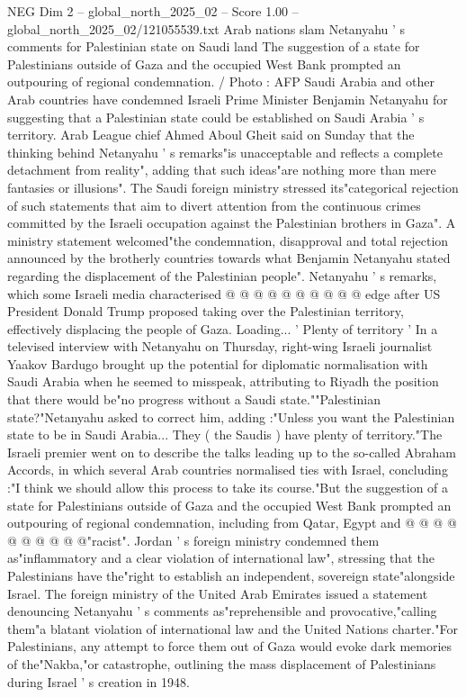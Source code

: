\begin{textsample}{NEG Dim 2 – global\_north\_2025\_02 – Score 1.00 – global\_north\_2025\_02/121055539.txt}  \label{ex:f2_neg_012}
Arab nations slam Netanyahu ' s comments for Palestinian state on Saudi land The suggestion of a state for Palestinians outside of Gaza and the occupied West Bank prompted an outpouring of regional condemnation. / Photo : AFP Saudi Arabia and other Arab countries have condemned Israeli Prime Minister Benjamin Netanyahu for suggesting that a Palestinian state could be established on Saudi Arabia ' s territory.
Arab League chief Ahmed Aboul Gheit said on Sunday that the thinking behind Netanyahu ' s remarks"is unacceptable and reflects a complete detachment from reality", adding that such ideas"are nothing more than mere fantasies or illusions".
The Saudi foreign ministry stressed its"categorical rejection of such statements that aim to divert attention from the continuous crimes committed by the Israeli occupation against the Palestinian brothers in Gaza".
A ministry statement welcomed"the condemnation, disapproval and total rejection announced by the brotherly countries towards what Benjamin Netanyahu stated regarding the displacement of the Palestinian people".
Netanyahu ' s remarks, which some Israeli media characterised @ @ @ @ @ @ @ @ @ @ edge after US President Donald Trump proposed taking over the Palestinian territory, effectively displacing the people of Gaza.
Loading... ' Plenty of territory ' In a televised interview with Netanyahu on Thursday, right-wing Israeli journalist Yaakov Bardugo brought up the potential for diplomatic normalisation with Saudi Arabia when he seemed to misspeak, attributing to Riyadh the position that there would be"no progress without a Saudi state.""Palestinian state?"Netanyahu asked to correct him, adding :"Unless you want the Palestinian state to be in Saudi Arabia...
They ( the Saudis ) have plenty of territory."The Israeli premier went on to describe the talks leading up to the so-called Abraham Accords, in which several Arab countries normalised ties with Israel, concluding :"I think we should allow this process to take its course."But the suggestion of a state for Palestinians outside of Gaza and the occupied West Bank prompted an outpouring of regional condemnation, including from Qatar, Egypt and @ @ @ @ @ @ @ @ @ @"racist".
Jordan ' s foreign ministry condemned them as"inflammatory and a clear violation of international law", stressing that the Palestinians have the"right to establish an independent, sovereign state"alongside Israel.
The foreign ministry of the United Arab Emirates issued a statement denouncing Netanyahu ' s comments as"reprehensible and provocative,"calling them"a blatant violation of international law and the United Nations charter."For Palestinians, any attempt to force them out of Gaza would evoke dark memories of the"Nakba,"or catastrophe, outlining the mass displacement of Palestinians during Israel ' s creation in 1948.

\end{textsample}
